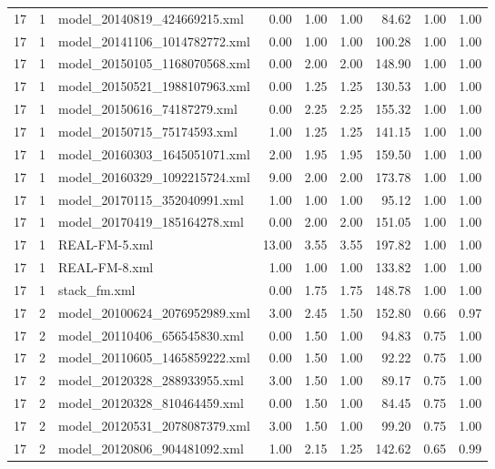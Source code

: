 \begin{table}[ht]
\begin{tabular}{rrlrrrrrr}
   17 &   1 & model\_20140819\_424669215.xml & 0.00 & 1.00 & 1.00 & 84.62 & 1.00 & 1.00 \\ 
   17 &   1 & model\_20141106\_1014782772.xml & 0.00 & 1.00 & 1.00 & 100.28 & 1.00 & 1.00 \\ 
   17 &   1 & model\_20150105\_1168070568.xml & 0.00 & 2.00 & 2.00 & 148.90 & 1.00 & 1.00 \\ 
   17 &   1 & model\_20150521\_1988107963.xml & 0.00 & 1.25 & 1.25 & 130.53 & 1.00 & 1.00 \\ 
   17 &   1 & model\_20150616\_74187279.xml & 0.00 & 2.25 & 2.25 & 155.32 & 1.00 & 1.00 \\ 
   17 &   1 & model\_20150715\_75174593.xml & 1.00 & 1.25 & 1.25 & 141.15 & 1.00 & 1.00 \\ 
   17 &   1 & model\_20160303\_1645051071.xml & 2.00 & 1.95 & 1.95 & 159.50 & 1.00 & 1.00 \\ 
   17 &   1 & model\_20160329\_1092215724.xml & 9.00 & 2.00 & 2.00 & 173.78 & 1.00 & 1.00 \\ 
   17 &   1 & model\_20170115\_352040991.xml & 1.00 & 1.00 & 1.00 & 95.12 & 1.00 & 1.00 \\ 
   17 &   1 & model\_20170419\_185164278.xml & 0.00 & 2.00 & 2.00 & 151.05 & 1.00 & 1.00 \\ 
   17 &   1 & REAL-FM-5.xml & 13.00 & 3.55 & 3.55 & 197.82 & 1.00 & 1.00 \\ 
   17 &   1 & REAL-FM-8.xml & 1.00 & 1.00 & 1.00 & 133.82 & 1.00 & 1.00 \\ 
   17 &   1 & stack\_fm.xml & 0.00 & 1.75 & 1.75 & 148.78 & 1.00 & 1.00 \\ 
   17 &   2 & model\_20100624\_2076952989.xml & 3.00 & 2.45 & 1.50 & 152.80 & 0.66 & 0.97 \\ 
   17 &   2 & model\_20110406\_656545830.xml & 0.00 & 1.50 & 1.00 & 94.83 & 0.75 & 1.00 \\ 
   17 &   2 & model\_20110605\_1465859222.xml & 0.00 & 1.50 & 1.00 & 92.22 & 0.75 & 1.00 \\ 
   17 &   2 & model\_20120328\_288933955.xml & 3.00 & 1.50 & 1.00 & 89.17 & 0.75 & 1.00 \\ 
   17 &   2 & model\_20120328\_810464459.xml & 0.00 & 1.50 & 1.00 & 84.45 & 0.75 & 1.00 \\ 
   17 &   2 & model\_20120531\_2078087379.xml & 3.00 & 1.50 & 1.00 & 99.20 & 0.75 & 1.00 \\ 
   17 &   2 & model\_20120806\_904481092.xml & 1.00 & 2.15 & 1.25 & 142.62 & 0.65 & 0.99 \\ 

\end{tabular}
\end{table}
